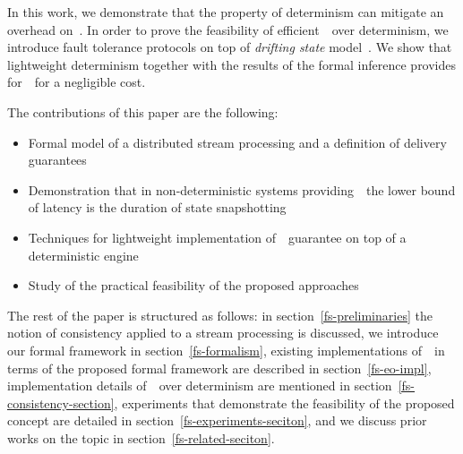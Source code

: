 In this work, we demonstrate that the property of determinism can mitigate an overhead on~\eo. 
In order to prove the feasibility of efficient~\eo\ over determinism, we introduce  fault tolerance protocols on top of {\em drifting state} model~\cite{we2018adbis}. 
We show that lightweight determinism together with the results of the formal inference provides for~\eo\ for a negligible  cost.

The contributions of this paper are the following: 
\begin{itemize}
    \item Formal model of a distributed stream processing  and   a   definition of  delivery guarantees 
    \item Demonstration that in non-deterministic systems providing~\eo\, the lower bound of latency is the duration of state snapshotting
    \item Techniques for lightweight implementation of~\eo\ guarantee on top of a deterministic engine
    \item Study of the practical feasibility of the proposed approaches
\end{itemize}

The rest of the paper is structured as follows: 
in section~\ref{fs-preliminaries} the notion of consistency applied to a stream processing is discussed, 
we introduce our formal framework in section~\ref{fs-formalism}, 
existing implementations of~\eo\ in terms of the proposed formal framework are described in section~\ref{fs-eo-impl}, 
implementation details of~\eo\ over determinism are mentioned in section~\ref{fs-consistency-section}, 
experiments that demonstrate the feasibility of the proposed concept are detailed in section~\ref{fs-experiments-seciton}, 
and we discuss prior works on the topic in section~\ref{fs-related-seciton}. 
